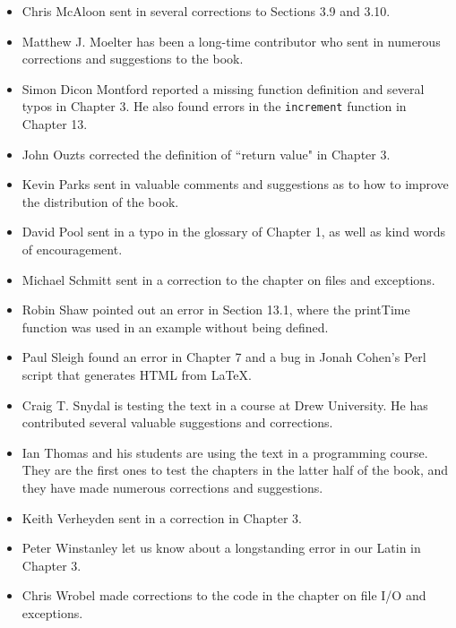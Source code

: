 \documentclass[10pt]{book}
\begin{document}
\begin{itemize}
\item Chris McAloon sent in several corrections to Sections 3.9 and
3.10.

\item Matthew J. Moelter has been a long-time contributor who sent
in numerous corrections and suggestions to the book.  

\item Simon Dicon Montford reported a missing function definition and
several typos in Chapter 3.  He also found errors in the {\tt increment}
function in Chapter 13.

\item John Ouzts corrected the definition of ``return value"
in Chapter 3.

\item Kevin Parks sent in valuable comments and suggestions as to how
to improve the distribution of the book.

\item David Pool sent in a typo in the glossary of Chapter 1, as well
as kind words of encouragement.

\item Michael Schmitt sent in a correction to the chapter on files
and exceptions.

\item Robin Shaw pointed out an error in Section 13.1, where the
printTime function was used in an example without being defined.

\item Paul Sleigh found an error in Chapter 7 and a bug in Jonah Cohen's
Perl script that generates HTML from LaTeX.

\item Craig T. Snydal is testing the text in a course at Drew
University.  He has contributed several valuable suggestions and corrections.

\item Ian Thomas and his students are using the text in a programming
course.  They are the first ones to test the chapters in the latter half
of the book, and they have made numerous corrections and suggestions.

\item Keith Verheyden sent in a correction in Chapter 3.

\item Peter Winstanley let us know about a longstanding error in
our Latin in Chapter 3.

\item Chris Wrobel made corrections to the code in the chapter on
file I/O and exceptions. 


\end{itemize}
\end{document}
